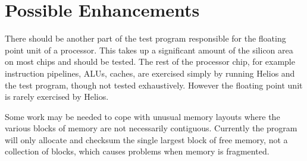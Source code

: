 \section{Possible Enhancements}

There should be another part of the test program responsible for the
floating point unit of a processor. This takes up a significant amount
of the silicon area on most chips and should be tested. The rest of the
processor chip, for example instruction pipelines, ALUs, caches, are
exercised simply by running Helios and the test program, though not tested
exhaustively. However the floating point unit is rarely exercised by
Helios.

Some work may be needed to cope with unusual memory layouts where the
various blocks of memory are not necessarily contiguous. Currently the
program will only allocate and checksum the single largest block of
free memory, not a collection of blocks, which causes problems when
memory is fragmented.




